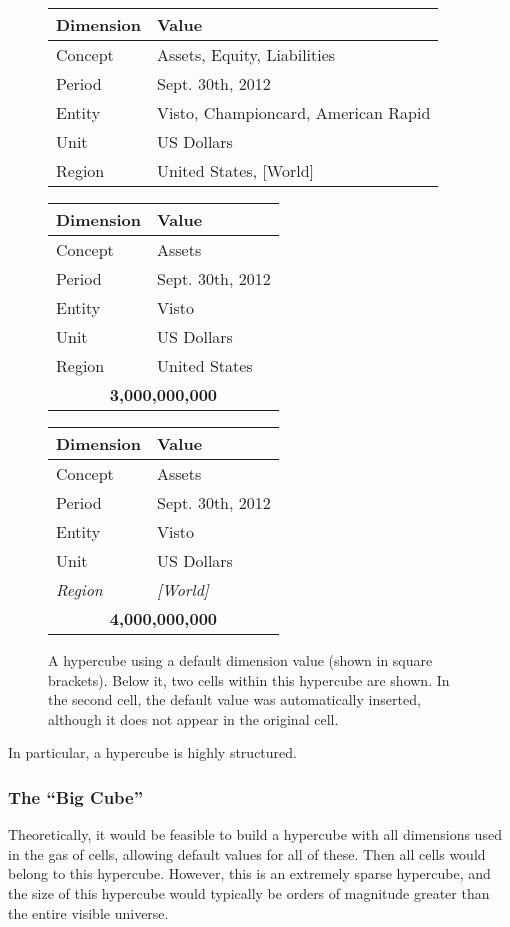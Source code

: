 \documentclass{acm_proc_article-sp}
\begin{document}
\begin{figure}
\centering
\caption{A hypercube using a default dimension value (shown in square brackets). Below it, two cells within this hypercube are shown. In the second cell, the default value was automatically inserted, although it does not appear in the original cell.}
\vspace{3mm}
\label{fig-default}
\begin{tabular}{|l|l|}
\hline
Dimension & Value \\
\hline
Concept & Assets, Equity, Liabilities \\
Period & Sept. 30th, 2012 \\
Entity & Visto, Championcard, American Rapid \\
Unit & US Dollars \\
Region & United States, [World] \\
\hline
\end{tabular}

\begin{tabular}{|l|l|}
\hline
Dimension & Value \\
\hline
Concept & Assets \\
Period & Sept. 30th, 2012 \\
Entity & Visto \\
Unit & US Dollars \\
Region & United States \\
\hline
\multicolumn{2}{|c|}{\textbf{3,000,000,000}} \\
\hline
\end{tabular}

\begin{tabular}{|l|l|}
\hline
Dimension & Value \\
\hline
Concept & Assets \\
Period & Sept. 30th, 2012 \\
Entity & Visto \\
Unit & US Dollars \\
\emph{Region} & \emph{[World]} \\
\hline
\multicolumn{2}{|c|}{\textbf{4,000,000,000}} \\
\hline
\end{tabular}
\end{figure}

In particular, a hypercube is highly structured.

\subsubsection{The ``Big Cube''}
Theoretically, it would be feasible to build a hypercube with all dimensions used in the gas of cells, allowing default values for all of these. Then all cells would belong to this hypercube. However, this is an extremely sparse hypercube, and the size of this hypercube would typically be orders of magnitude greater than the entire visible universe.
\end{document}
